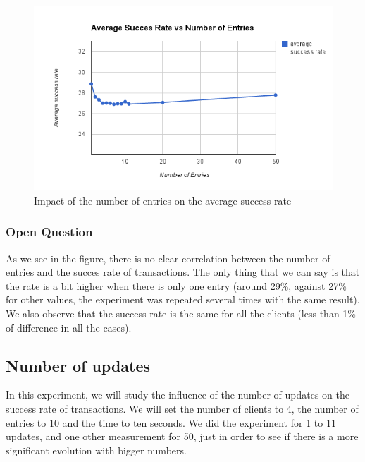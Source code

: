 \documentclass[a4paper, 11pt]{article}
\begin{document}
\begin{figure}[H]
\begin{center}
\includegraphics[scale=0.5]{exp2.png}
\caption{Impact of the number of entries on the average success rate}
\end{center}
\end{figure}

\subsubsection{Open Question}
As we see in the figure, there is no clear correlation between the number of entries and the succes rate of transactions. The only thing that we can say is that the rate is a bit higher when there is only one entry (around 29\%, against 27\% for other values, the experiment was repeated several times with the same result). We also observe that the success rate is the same for all the clients (less than 1\% of difference in all the cases).


\subsection{Number of updates}
In this experiment, we will study the influence of the number of updates on the success rate of transactions. We will set the number of clients to 4, the number of entries to 10 and the time to ten seconds. We did the experiment for 1 to 11 updates, and one other measurement for 50, just in order to see if there is a more significant evolution with bigger numbers.
\end{document}

